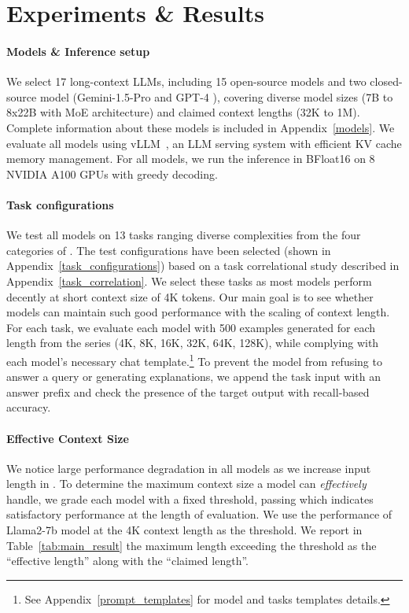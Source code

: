 \section{Experiments \& Results}

\paragraph{Models \& Inference setup} We select 17 long-context LLMs, including 15 open-source models and two closed-source model (Gemini-1.5-Pro and GPT-4 ), covering diverse model sizes (7B to 8x22B with MoE architecture) and claimed context lengths (32K to 1M). Complete information about these models is included in Appendix~\ref{models}. We evaluate all models using vLLM~\citep{vllm}, an LLM serving system with efficient KV cache memory management. For all models, we run the inference in BFloat16 on 8 NVIDIA A100 GPUs with greedy decoding.
\paragraph{Task configurations} We test all models on 13 tasks ranging diverse complexities from the four categories of .
The test configurations have been selected (shown in Appendix~\ref{task_configurations}) based on a task correlational study described in Appendix~\ref{task_correlation}. We select these tasks as most models perform decently at short context size of 4K tokens. Our main goal is to see whether models can maintain such good performance with the scaling of context length.
For each task, we evaluate each model with 500 examples generated for each length from the series (4K, 8K, 16K, 32K, 64K, 128K), while complying with each model's necessary chat template.\footnote{See Appendix~\ref{prompt_templates} for model and tasks templates details.}
To prevent the model from refusing to answer a query or generating explanations, we append the task input with an answer prefix and check the presence of the target output with recall-based accuracy.

\paragraph{Effective Context Size} 
We notice large performance degradation in all models as we increase input length in . To determine the maximum context size a model can \emph{effectively} handle, we grade each model with a fixed threshold, passing which indicates satisfactory performance at the length of evaluation. We use the performance of Llama2-7b model at the 4K context length as the threshold.
We report in Table~\ref{tab:main_result} the maximum length exceeding the threshold as the ``effective length'' along with the ``claimed length''. 
